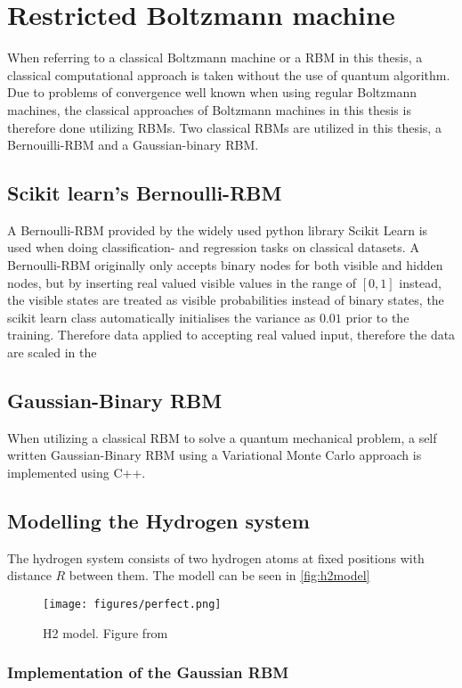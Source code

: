 \documentclass[../main.tex]{subfiles}
\begin{document}

\section{Restricted Boltzmann machine}
When referring to a classical Boltzmann machine or a RBM in this thesis, a classical computational approach is taken without the use of quantum algorithm. Due to problems of convergence well known when using regular Boltzmann machines, the classical approaches of Boltzmann machines in this thesis is therefore done utilizing RBMs. Two classical RBMs are utilized in this thesis, a Bernouilli-RBM and a Gaussian-binary RBM.

\subsection{Scikit learn's Bernoulli-RBM}
A Bernoulli-RBM provided by the widely used python library Scikit Learn\cite{scikitlearn} is used when doing classification- and regression tasks on classical datasets. A Bernoulli-RBM originally only accepts binary nodes for both visible and hidden nodes, but by inserting  real valued visible values in the range of $[0,1]$ instead, the visible states are treated as visible probabilities instead of binary states, the scikit learn class automatically initialises the variance as $0.01$ prior to the training. Therefore data applied to  accepting real valued input, therefore the data are scaled in the 

\subsection{Gaussian-Binary RBM}
When utilizing a classical RBM to solve a quantum mechanical problem, a self written Gaussian-Binary RBM using a Variational Monte Carlo approach is implemented using C++.

\subsection{Modelling the Hydrogen system}
The hydrogen system consists of two hydrogen atoms at fixed positions with distance $R$ between them. The modell can be seen in \autoref{fig:h2model}

\begin{figure}[ht]
    \begin{center}
        \texttt{[image: figures/perfect.png]}
        \caption{H2 model. Figure from \cite{hydrogen_model_figure}}
        \label{fig:h2model}
    \end{center}
\end{figure}

\subsubsection{Implementation of the Gaussian RBM}
\end{document}
